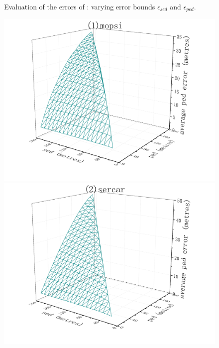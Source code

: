 \begin{figure}[tb!]
	\vspace{-2ex}
	\caption{\small Evaluation of the \sed errors of \bitt: varying error bounds $\epsilon_{sed}$ and $\epsilon_{ped}$.}
	\label{fig:bitt-sed-error}
	\vspace{-1ex}
\end{figure}



\begin{figure}[tb!]
	\centering
	\includegraphics[scale = 0.56]{figures/Fig-BITT-mopsi-ped-error.png}\hspace{1ex}
	\includegraphics[scale = 0.56]{figures/Fig-BITT-sercar-ped-error.png}\hspace{1ex}

\end{figure}
